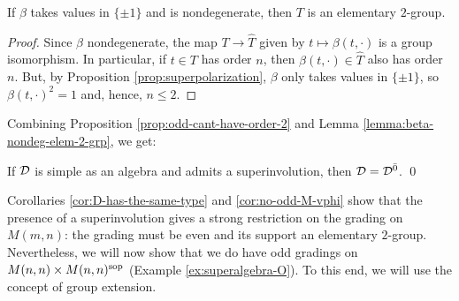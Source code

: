\begin{lemma}\label{lemma:beta-nondeg-elem-2-grp}
    If $\beta$ takes values in $\{ \pm 1 \}$ and is nondegenerate, then $T$ is an elementary $2$-group.
\end{lemma}

\begin{proof}
    Since $\beta$ nondegenerate, the map $T \to \widehat T$ given by $t \mapsto \beta(t, \cdot)$ is a group isomorphism.
    In particular, if $t\in T$ has order $n$, then $\beta(t, \cdot)\in \widehat T$ also has order $n$.
    But, by Proposition \ref{prop:superpolarization}, $\beta$ only takes values in $\{ \pm 1\}$, so  $\beta(t, \cdot )^2 =1$ and, hence, $ n \leq 2$.
\end{proof}

Combining Proposition \ref{prop:odd-cant-have-order-2} and Lemma \ref{lemma:beta-nondeg-elem-2-grp}, we get:

\begin{cor}\label{cor:no-odd-M-vphi}
    If $\mathcal{D}$ is simple as an algebra and admits a superinvolution, then $\mathcal{D} = \mathcal{D}^{\bar0}$. \qed
\end{cor}


Corollaries \ref{cor:D-has-the-same-type} and \ref{cor:no-odd-M-vphi} show that the presence of a superinvolution gives a strong restriction on the grading on $M(m,n)$: the grading must be even and its support an elementary $2$-group. 
Nevertheless, we will now show that we do have odd gradings on $M(n,n)\times M(n,n)^{\mathrm{sop}}$ (Example \ref{ex:superalgebra-O}). 
To this end, we will use the concept of group extension.

